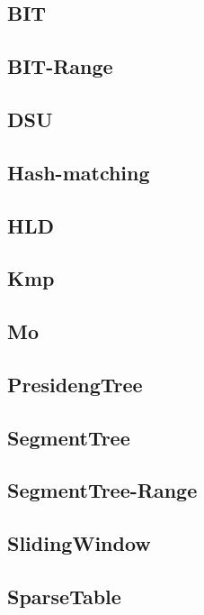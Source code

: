 \documentclass{article}
\begin{document}
\subsection{BIT}

\subsection{BIT-Range}

\subsection{DSU}

\subsection{Hash-matching}

\subsection{HLD}

\subsection{Kmp}

\subsection{Mo}

\subsection{PresidengTree}

\subsection{SegmentTree}

\subsection{SegmentTree-Range}

\subsection{SlidingWindow}

\subsection{SparseTable}

\end{document}
